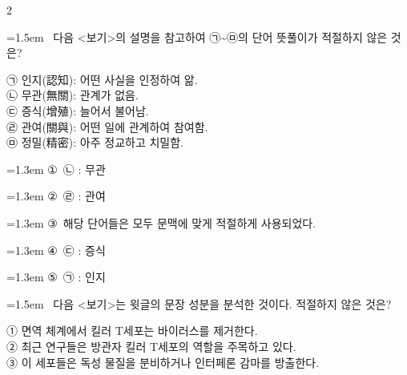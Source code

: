 \documentclass[10pt, a4paper]{article}
\begin{document}
\begin{multicols}{2}
\noindent\begin{minipage}{\columnwidth}
\vspace{2mm}
{\hangindent=1.5em  ~다음 <보기>의 설명을 참고하여 ㉠\textasciitilde{}㉤의 단어 뜻풀이가 적절하지 않은 것은?\par}

\vspace{1mm}
\begin{boxibox}
㉠ 인지(認知): 어떤 사실을 인정하여 앎. \\
㉡ 무관(無關): 관계가 없음. \\
㉢ 증식(增殖): 늘어서 불어남. \\
㉣ 관여(關與): 어떤 일에 관계하여 참여함. \\
㉤ 정밀(精密): 아주 정교하고 치밀함. \\
\end{boxibox}
\vspace{1mm}

\vspace{0.5mm}
{\hangindent=1.3em  \noindent\hspace{0.3em}①~㉡ : 무관\par}
{\hangindent=1.3em  \noindent\hspace{0.3em}②~㉣ : 관여\par}
{\hangindent=1.3em  \noindent\hspace{0.3em}③~해당 단어들은 모두 문맥에 맞게 적절하게 사용되었다.\par}
{\hangindent=1.3em  \noindent\hspace{0.3em}④~㉢ : 증식\par}
{\hangindent=1.3em  \noindent\hspace{0.3em}⑤~㉠ : 인지\par}
\vspace{4mm}
\end{minipage}
\par

\noindent\begin{minipage}{\columnwidth}
\vspace{2mm}
{\hangindent=1.5em  ~다음 <보기>는 윗글의 문장 성분을 분석한 것이다. 적절하지 않은 것은?\par}

\vspace{1mm}
\begin{boxibox}
① 면역 체계에서 킬러 T세포는 바이러스를 제거한다. \\
② 최근 연구들은 방관자 킬러 T세포의 역할을 주목하고 있다. \\
③ 이 세포들은 독성 물질을 분비하거나 인터페론 감마를 방출한다. \\
\end{boxibox}
\vspace{1mm}


\end{minipage}
\end{multicols}
\end{document}
